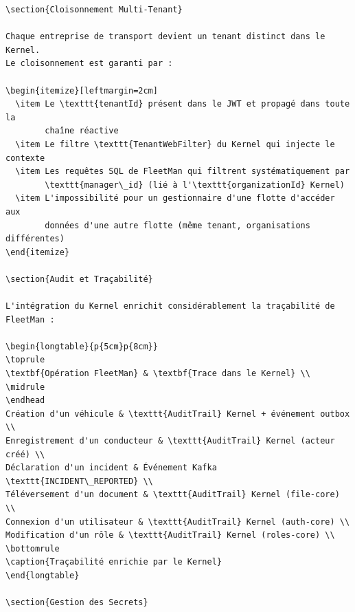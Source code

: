 \documentclass[12pt,a4paper]{report}
\begin{document}
\begin{lstlisting}[style=javaStyle, caption={Circuit Breaker vers le Kernel}]
\section{Cloisonnement Multi-Tenant}

Chaque entreprise de transport devient un tenant distinct dans le Kernel.
Le cloisonnement est garanti par :

\begin{itemize}[leftmargin=2cm]
  \item Le \texttt{tenantId} présent dans le JWT et propagé dans toute la
        chaîne réactive
  \item Le filtre \texttt{TenantWebFilter} du Kernel qui injecte le contexte
  \item Les requêtes SQL de FleetMan qui filtrent systématiquement par
        \texttt{manager\_id} (lié à l'\texttt{organizationId} Kernel)
  \item L'impossibilité pour un gestionnaire d'une flotte d'accéder aux
        données d'une autre flotte (même tenant, organisations différentes)
\end{itemize}

\section{Audit et Traçabilité}

L'intégration du Kernel enrichit considérablement la traçabilité de FleetMan :

\begin{longtable}{p{5cm}p{8cm}}
\toprule
\textbf{Opération FleetMan} & \textbf{Trace dans le Kernel} \\
\midrule
\endhead
Création d'un véhicule & \texttt{AuditTrail} Kernel + événement outbox \\
Enregistrement d'un conducteur & \texttt{AuditTrail} Kernel (acteur créé) \\
Déclaration d'un incident & Événement Kafka \texttt{INCIDENT\_REPORTED} \\
Téléversement d'un document & \texttt{AuditTrail} Kernel (file-core) \\
Connexion d'un utilisateur & \texttt{AuditTrail} Kernel (auth-core) \\
Modification d'un rôle & \texttt{AuditTrail} Kernel (roles-core) \\
\bottomrule
\caption{Traçabilité enrichie par le Kernel}
\end{longtable}

\section{Gestion des Secrets}


\end{lstlisting}
\end{document}
